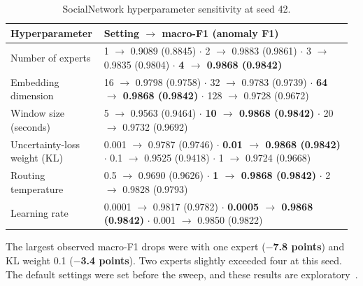 \documentclass[11pt,a4paper,onecolumn]{IEEEtran}
\begin{document}
\begin{table}[H]
\centering
\small
\setlength{\tabcolsep}{4pt}
\renewcommand{\arraystretch}{1.18}
\caption{SocialNetwork hyperparameter sensitivity at seed 42.}
\begin{tabular}{@{}P{0.26\linewidth}P{0.71\linewidth}@{}}
\toprule
\textbf{Hyperparameter} & \textbf{Setting \ensuremath{\rightarrow} macro-F1 (anomaly F1)} \\
\midrule
Number of experts &
  1 \ensuremath{\rightarrow} 0.9089 (0.8845) \ensuremath{\cdot} 2 \ensuremath{\rightarrow} 0.9883 (0.9861) \ensuremath{\cdot} 3 \ensuremath{\rightarrow} 0.9835 (0.9804) \ensuremath{\cdot} \textbf{4 \ensuremath{\rightarrow} 0.9868 (0.9842)} \\
Embedding dimension &
  16 \ensuremath{\rightarrow} 0.9798 (0.9758) \ensuremath{\cdot} 32 \ensuremath{\rightarrow} 0.9783 (0.9739) \ensuremath{\cdot} \textbf{64 \ensuremath{\rightarrow} 0.9868 (0.9842)} \ensuremath{\cdot} 128 \ensuremath{\rightarrow} 0.9728 (0.9672) \\
Window size (seconds) &
  5 \ensuremath{\rightarrow} 0.9563 (0.9464) \ensuremath{\cdot} \textbf{10 \ensuremath{\rightarrow} 0.9868 (0.9842)} \ensuremath{\cdot} 20 \ensuremath{\rightarrow} 0.9732 (0.9692) \\
Uncertainty-loss weight (KL) &
  0.001 \ensuremath{\rightarrow} 0.9787 (0.9746) \ensuremath{\cdot} \textbf{0.01 \ensuremath{\rightarrow} 0.9868 (0.9842)} \ensuremath{\cdot} 0.1 \ensuremath{\rightarrow} 0.9525 (0.9418) \ensuremath{\cdot} 1 \ensuremath{\rightarrow} 0.9724 (0.9668) \\
Routing temperature &
  0.5 \ensuremath{\rightarrow} 0.9690 (0.9626) \ensuremath{\cdot} \textbf{1 \ensuremath{\rightarrow} 0.9868 (0.9842)} \ensuremath{\cdot} 2 \ensuremath{\rightarrow} 0.9828 (0.9793) \\
Learning rate &
  0.0001 \ensuremath{\rightarrow} 0.9817 (0.9782) \ensuremath{\cdot} \textbf{0.0005 \ensuremath{\rightarrow} 0.9868 (0.9842)} \ensuremath{\cdot} 0.001 \ensuremath{\rightarrow} 0.9850 (0.9822) \\
\bottomrule
\end{tabular}
\end{table}

The largest observed macro-F1 drops were with one expert (\textbf{\ensuremath{-}7.8 points}) and KL weight
0.1 (\textbf{\ensuremath{-}3.4 points}). Two experts slightly exceeded four at this seed. The default
settings were set before the sweep, and these results are
exploratory~\cite{implementation-report,experiment-results}.
\end{document}

